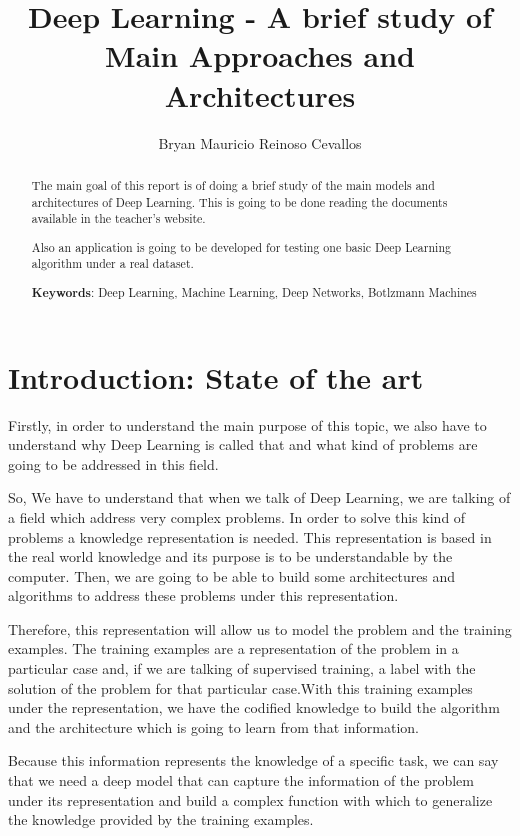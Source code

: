 \documentclass[12pt]{article}
\title{Deep Learning - A brief study of Main Approaches and Architectures}
\author{Bryan Mauricio Reinoso Cevallos}
\begin{document}
 

\maketitle
\begin{abstract} 
The main goal of this report is of doing a brief study of the main models and architectures of Deep Learning. This is going to be done reading the documents available in the teacher's website. 

Also an application is going to be developed for testing one basic Deep Learning algorithm under a real dataset\cite{heartDiseaseB,heartDiseaseC,heartDiseaseH,heartDiseaseZ}.
  
  \textbf{Keywords}: Deep Learning, Machine Learning, Deep Networks, Botlzmann Machines
\end{abstract}

\section{Introduction: State of the art}

Firstly, in order to understand the main purpose of this topic, we also have to understand why Deep Learning is called that and what kind of problems are going to be addressed in this field.

So, We have to understand that when we talk of Deep Learning, we are talking of a field which address very complex problems. In order to solve this kind of problems a knowledge representation is needed. This representation is based in the real world knowledge and its purpose is to be understandable by the computer. Then, we are going to be able to build some architectures and algorithms to address these problems under this representation.

Therefore, this representation will allow us to model the problem and the training examples. The training examples are a representation of the problem in a particular case and, if we are talking of supervised training, a label with the solution of the problem for that particular case.With this training examples under the representation, we have the codified knowledge to build the algorithm and the architecture which is going to learn from that information.

Because this information represents the knowledge of a specific task, we can say that we need a deep model that can capture the information of the problem under its representation and build a complex function with which to generalize the knowledge provided by the training examples.
\end{document}
